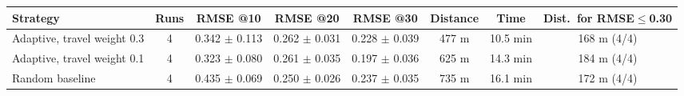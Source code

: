 \begin{tabular}{@{}lccccccc@{}}
\toprule
\textbf{Strategy} & \textbf{Runs} & \textbf{RMSE @10} & \textbf{RMSE @20} & \textbf{RMSE @30} & \textbf{Distance} & \textbf{Time} & \textbf{Dist.\ for RMSE$\le$0.30} \\
\midrule
Adaptive, travel weight 0.3 & 4 & 0.342 $\pm$ 0.113 & 0.262 $\pm$ 0.031 & 0.228 $\pm$ 0.039 & 477 m & 10.5 min & 168 m (4/4) \\
Adaptive, travel weight 0.1 & 4 & 0.323 $\pm$ 0.080 & 0.261 $\pm$ 0.035 & 0.197 $\pm$ 0.036 & 625 m & 14.3 min & 184 m (4/4) \\
Random baseline & 4 & 0.435 $\pm$ 0.069 & 0.250 $\pm$ 0.026 & 0.237 $\pm$ 0.035 & 735 m & 16.1 min & 172 m (4/4) \\
\bottomrule
\end{tabular}
